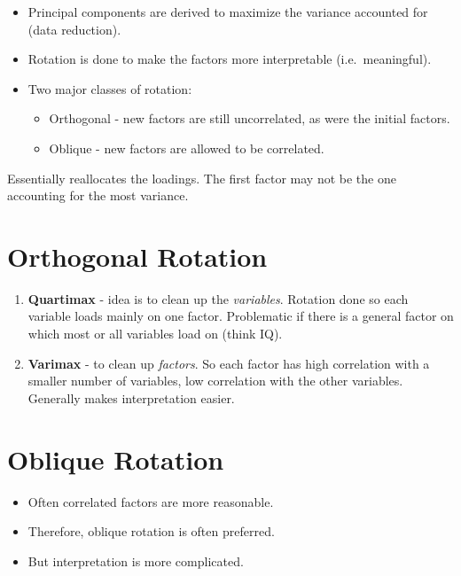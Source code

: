 \documentclass[
]{book}
\providecommand{\tightlist}{%
  \setlength{\itemsep}{0pt}\setlength{\parskip}{0pt}}
\begin{document}
\begin{itemize}
\tightlist
\item
  Principal components are derived to maximize the variance accounted for (data reduction).
\item
  Rotation is done to make the factors more interpretable (i.e.~meaningful).
\item
  Two major classes of rotation:

  \begin{itemize}
  \tightlist
  \item
    Orthogonal - new factors are still uncorrelated, as were the initial factors.
  \item
    Oblique - new factors are allowed to be correlated.
  \end{itemize}
\end{itemize}

Essentially reallocates the loadings. The first factor may not be the one accounting for the most variance.

\hypertarget{orthogonal-rotation}{%
\section{Orthogonal Rotation}\label{orthogonal-rotation}}

\begin{enumerate}
\def\labelenumi{\arabic{enumi}.}
\item
  \textbf{Quartimax} - idea is to clean up the \emph{variables}. Rotation done so each variable loads mainly on one factor. Problematic if there is a general factor on which most or all variables load on (think IQ).
\item
  \textbf{Varimax} - to clean up \emph{factors}. So each factor has high correlation with a smaller number of variables, low correlation with the other variables. Generally makes interpretation easier.
\end{enumerate}

\hypertarget{oblique-rotation}{%
\section{Oblique Rotation}\label{oblique-rotation}}

\begin{itemize}
\tightlist
\item
  Often correlated factors are more reasonable.
\item
  Therefore, oblique rotation is often preferred.
\item
  But interpretation is more complicated.
\end{itemize}
\end{document}

